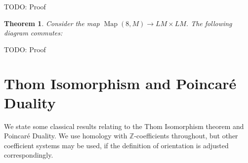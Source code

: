 \documentclass{scrartcl}
\theoremstyle{plain}
\newtheorem{theorem}{Theorem}[section]
\theoremstyle{definition}
\newcommand{\Z}{\mathbb Z}
\DeclareMathOperator{\Map}{Map}
\begin{document}
TODO: Proof

\begin{theorem}
    Consider the map $\Map(8, M)\to LM\times LM$. The following diagram commutes:

    \begin{center}
    \end{center}
\end{theorem}

TODO: Proof









\newpage
\appendix
\section{Thom Isomorphism and Poincaré Duality}
We state some classical results relating to the Thom Isomorphism theorem and Poincaré Duality. We use homology with $\Z$-coefficients throughout, but other coefficient systems may be used, if the definition of orientation is adjusted correspondingly.
\end{document}
